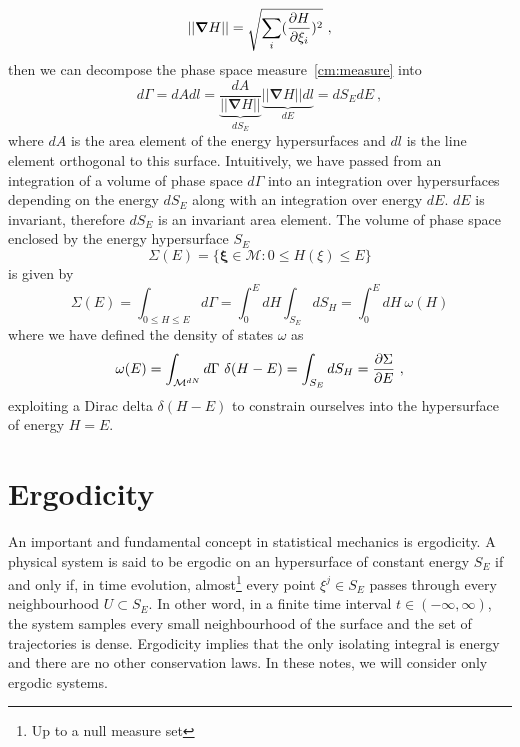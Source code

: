     \begin{equation*}
        ||\boldsymbol \nabla H|| = \sqrt{\sum_i (\frac{\partial H}{\partial\xi_i})^2} ~,
    \end{equation*}
    then we can decompose the phase space measure~\eqref{cm:measure} into 
    \begin{equation}\label{cm:fol}
        d \Gamma = dA dl = \underbrace{\frac{dA}{||\boldsymbol \nabla H||}}_{dS_E} \underbrace{||\boldsymbol \nabla H|| dl}_{dE} = dS_E dE ~,
    \end{equation}
    where $dA$ is the area element of the energy hypersurfaces and $dl$ is the line element orthogonal to this surface. Intuitively, we have passed from an integration of a volume of phase space $d\Gamma$ into an integration over hypersurfaces depending on the energy $dS_E$ along with an integration over energy $dE$. $dE$ is invariant, therefore $dS_E$ is an invariant area element. The volume of phase space enclosed by the energy hypersurface $S_E$ 
    \begin{equation*}
        \Sigma(E) = \{ \boldsymbol \xi \in \mathcal M \colon 0 \leq H(\xi) \leq E \} 
    \end{equation*}
    is given by 
    \begin{equation}\label{cm:vol}
        \Sigma(E) = \int_{0 \leq H \leq E} d\Gamma = \int_0^E dH \int_{S_E} dS_{H} = \int_0^E dH ~ \omega(H)
    \end{equation}
    where we have defined the density of states $\omega$ as 
    \begin{equation}\label{cm:denst}
        \omega (E) = \int_{\mathcal M^{dN}} d\Gamma ~ \delta (H- E) = \int_{S_E} dS_H = \frac{\partial\Sigma}{\partial E} ~,
    \end{equation}
    exploiting a Dirac delta $\delta (H - E)$ to constrain ourselves into the hypersurface of energy $H = E$.

\section{Ergodicity}

    An important and fundamental concept in statistical mechanics is ergodicity. A physical system is said to be ergodic on an hypersurface of constant energy $S_E$ if and only if, in time evolution, almost\footnote{Up to a null measure set} every point $\xi^j \in S_E$ passes through every neighbourhood $U \subset S_E$. In other word, in a finite time interval $t \in (- \infty, \infty)$, the system samples every small neighbourhood of the surface and the set of trajectories is dense. Ergodicity implies that the only isolating integral is energy and there are no other conservation laws. In these notes, we will consider only ergodic systems.

